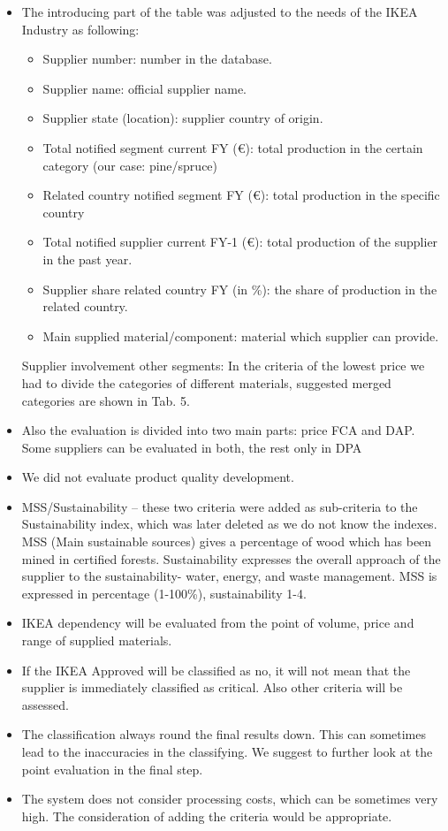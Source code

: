 \documentclass[oneside,12pt]{article}%
\begin{document}
\begin{itemize}
  \item The introducing part of the table was adjusted to the needs of the IKEA Industry as following:

    \begin{itemize}
      \item Supplier number: number in the database.
      \item Supplier name: official supplier name.
      \item Supplier state (location): supplier country of origin.
      \item Total notified segment current FY (\euro): total production in the certain category (our case: pine/spruce)
      \item Related country notified segment FY (\euro): total production in the specific country
      \item Total notified supplier current FY-1 (\euro): total production of the supplier in the past year.
      \item Supplier share related country FY (in \%): the share of production in the related country.
      \item Main supplied material/component: material which supplier can provide.
    \end{itemize}
    Supplier involvement other segments:
    In the criteria of the lowest price we had to divide the categories of different materials, suggested merged categories are shown in Tab. 5.

    \item Also the evaluation is divided into two main parts: price FCA and DAP. Some suppliers can be evaluated in both, the rest only in DPA
    \item We did not evaluate product quality development.
    \item MSS/Sustainability – these two criteria were added as sub-criteria to the Sustainability index, which was later deleted as we do not know the indexes. MSS (Main sustainable sources) gives a percentage of wood which has been mined in certified forests. Sustainability expresses the overall approach of the supplier to the sustainability- water, energy, and waste management. MSS is expressed in percentage (1-100\%), sustainability 1-4.
  \item IKEA dependency will be evaluated from the point of volume, price and range of supplied materials.
  \item If the IKEA Approved will be classified as no, it will not mean that the supplier is immediately classified as critical. Also other criteria will be assessed.
  \item The classification always round the final results down. This can sometimes lead to the inaccuracies in the classifying. We suggest to further look at the point evaluation in the final step.
  \item The system does not consider processing costs, which can be sometimes very high. The consideration of adding the criteria would be appropriate.

\end{itemize}
\end{document}
